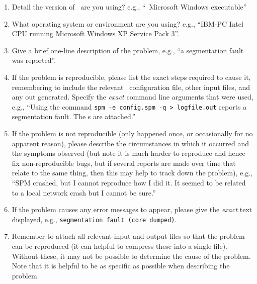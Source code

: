 \begin{enumerate}
\item Detail the version of \SPM\ are you using? e.g., ``\SPM\ \VER Microsoft Windows executable''

\item What operating system or environment are you using? e.g., ``IBM-PC Intel CPU running Microsoft Windows XP Service Pack 3''.

\item Give a brief one-line description of the problem, e.g., ``a segmentation fault was reported''.

\item If the problem is reproducible, please list the exact steps required to cause it, remembering to include the relevant \SPM\ configuration file, other input files, and any out generated. Specify the \emph{exact} command line arguments that were used, e.g., ``Using the command \texttt{spm -e config.spm -q > logfile.out} reports a segmentation fault. The \config s are attached.''

\item If the problem is not reproducible (only happened once, or occasionally for no apparent reason), please describe the circumstances in which it occurred and the symptoms observed (but note it is much harder to reproduce and hence fix non-reproducible bugs, but if several reports are made over time that relate to the same thing, then this may help to track down the problem), e.g., ``SPM crashed, but I cannot reproduce how I did it. It seemed to be related to a local network crash but I cannot be sure.''

\item If the problem causes any error messages to appear, please give the \emph{exact} text displayed, e.g., \texttt{segmentation fault (core dumped)}.

\item Remember to attach all relevant input and output files so that the problem can be reproduced (it can helpful to compress these into a single file). Without these, it may not be possible to determine the cause of the problem. Note that it is helpful to be as specific as possible when describing the problem.

\end{enumerate}
